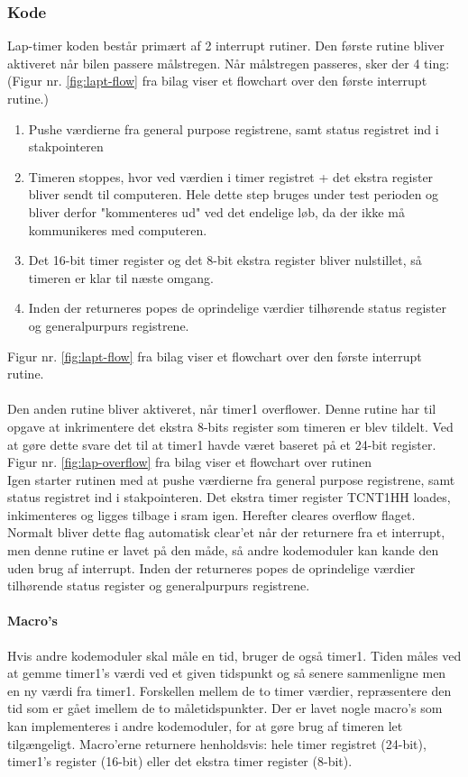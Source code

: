 \subsubsection{Kode}
Lap-timer koden består primært af 2 interrupt rutiner. Den første rutine bliver aktiveret når bilen passere målstregen. Når målstregen passeres, sker der 4 ting: (Figur nr. \ref{fig:lapt-flow} fra bilag viser et flowchart over den første interrupt rutine.)

\begin{enumerate}
\item Pushe værdierne fra general purpose registrene, samt status registret ind i stakpointeren
\item Timeren stoppes, hvor ved værdien i timer registret + det ekstra register bliver sendt til computeren. Hele dette step bruges under test perioden og bliver derfor "kommenteres ud" ved det endelige løb, da der ikke må kommunikeres med computeren.
\item Det 16-bit timer register og det 8-bit ekstra register bliver nulstillet, så timeren er klar til næste omgang.
\item Inden der returneres popes de oprindelige værdier tilhørende status register og generalpurpurs registrene.
\end{enumerate}
Figur nr. \ref{fig:lapt-flow} fra bilag viser et flowchart over den første interrupt rutine.\\
\\

Den anden rutine bliver aktiveret, når timer1 overflower. Denne rutine har til opgave at inkrimentere det ekstra 8-bits register som timeren er blev tildelt. Ved at gøre dette svare det til at timer1 havde været baseret på et 24-bit register. Figur nr. \ref{fig:lap-overflow} fra bilag viser et flowchart over rutinen\\ Igen starter rutinen med at pushe værdierne fra general purpose registrene, samt status registret ind i stakpointeren. Det ekstra timer register TCNT1HH loades, inkimenteres og ligges tilbage i sram igen. Herefter cleares overflow flaget. Normalt bliver dette flag automatisk clear'et når der returnere fra et interrupt, men denne rutine er lavet på den måde, så andre kodemoduler kan kande den uden brug af interrupt. Inden der returneres popes de oprindelige værdier tilhørende status register og generalpurpurs registrene.

\paragraph{Macro's}
Hvis andre kodemoduler skal måle en tid, bruger de også timer1. Tiden måles ved at gemme timer1's værdi ved et given tidspunkt og så senere sammenligne men en ny værdi fra timer1. Forskellen mellem de to timer værdier, repræsentere den tid som er gået imellem de to måletidspunkter.
Der er lavet nogle macro's som kan implementeres i andre kodemoduler, for at gøre brug af timeren let tilgængeligt. Macro'erne returnere henholdsvis: hele timer registret (24-bit), timer1's register (16-bit) eller det ekstra timer register (8-bit). \\
\\
